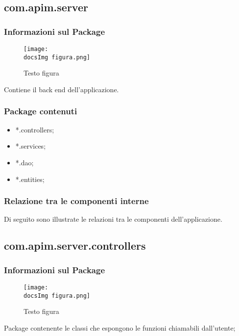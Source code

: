{  \subsection{com.apim.server}{
    \subsubsection{Informazioni sul Package}
        \begin{figure}[ht]
          \centering
          \texttt{[image: \\docsImg figura.png]}
          \caption{Testo figura}
          \label{Testo figura}
        \end{figure}
        Contiene il back end dell'applicazione.
        \subsubsection{Package contenuti}
        \begin{itemize} \itemsep1pt
        \item *.controllers;
        \item *.services;
        \item *.dao;
        \item *.entities;
        \end{itemize}
        \subsubsection{Relazione tra le componenti interne}
        Di seguito sono illustrate le relazioni tra le componenti dell'applicazione.
  }
  \subsection{com.apim.server.controllers}{
    \subsubsection{Informazioni sul Package}
        \begin{figure}[ht]
          \centering
          \texttt{[image: \\docsImg figura.png]}
          \caption{Testo figura}
          \label{Testo figura}
        \end{figure}
        Package contenente le classi che espongono le funzioni  chiamabili dall'utente;
}}
